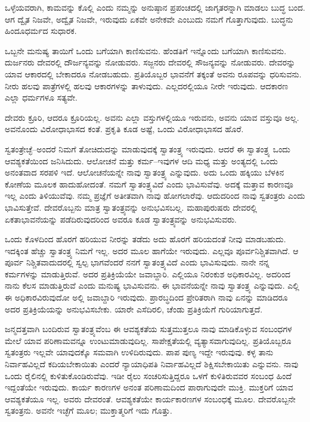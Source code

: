 ಒಳ್ಳೆಯವರಾಗಿ, ಕಾಮವನ್ನು ಕೊಲ್ಲಿ ಎಂದು ನಮ್ಮನ್ನು ಅನುಷ್ಠಾನ ಪ್ರಪಂಚದಲ್ಲಿ ಜಾಗೃತರನ್ನಾಗಿ ಮಾಡಲು ಬುದ್ಧ ಬಂದ. ಆಗ ದ್ವೈತ ನಿಜವೇ, ಅದ್ವೈತ ನಿಜವೇ, ಇರುವುದು ಏಕವೇ ಅನೇಕವೇ ಎಂಬುದು ನಮಗೆ ಗೊತ್ತಾಗುವುದು. ಬುದ್ಧನು ಹಿಂದೂಧರ್ಮದ ಸುಧಾರಕ.

ಒಬ್ಬನೇ ಮನುಷ್ಯ ತಾಯಿಗೆ ಒಂದು ಬಗೆಯಾಗಿ ಕಾಣಿಸುವನು. ಹೆಂಡತಿಗೆ ಇನ್ನೊಂದು ಬಗೆಯಾಗಿ ಕಾಣಿಸುವನು. ದುರ್ಜನರು ದೇವರಲ್ಲಿ ದೌರ್ಜನ್ಯವನ್ನು ನೋಡುವರು. ಸಜ್ಜನರು ದೇವರಲ್ಲಿ ಸೌಜನ್ಯವನ್ನು ನೋಡುವರು. ದೇವರನ್ನು ಯಾವ ಆಕಾರದಲ್ಲಿ ಬೇಕಾದರೂ ನೋಡಬಹುದು. ಪ್ರತಿಯೊಬ್ಬರ ಭಾವನೆಗೆ ತಕ್ಕಂತೆ ಅವನು ರೂಪವನ್ನು ಧರಿಸುವನು. ನೀರು ಹಲವು ಪಾತ್ರೆಗಳಲ್ಲಿ ಹಲವು ಆಕಾರಗಳನ್ನು ತಾಳುವುದು. ಎಲ್ಲದರಲ್ಲಿಯೂ ನೀರೇ ಇರುವುದು. ಆದಕಾರಣ ಎಲ್ಲಾ ಧರ್ಮಗಳೂ ಸತ್ಯವೇ.

ದೇವರು ಕ್ರೂರಿ, ಆದರೂ ಕ್ರೂರಿಯಲ್ಲ. ಅವನು ಎಲ್ಲಾ ವಸ್ತುಗಳಲ್ಲಿಯೂ ಇರುವನು, ಅವನು ಯಾವ ವಸ್ತುವೂ ಅಲ್ಲ. ಅವನೊಂದು ವಿರೋಧಾಭಾಸದ ಕಂತೆ. ಪ್ರಕೃತಿ ಕೂಡ ಅಷ್ಟೆ, ಒಂದು ವಿರೋಧಾಭಾಸದ ಹೊರೆ.

ಸ್ವತಂತ್ರೇಚ್ಛೆ–ಅಂದರೆ ನಿಮಗೆ ತೋಚಿದುದನ್ನು ಮಾಡುವುದಕ್ಕೆ ಸ್ವಾತಂತ್ರ್ಯ ಇರುವುದು. ಆದರೆ ಈ ಸ್ವಾತಂತ್ರ್ಯ ಒಂದು ಆವಶ್ಯಕತೆಯಿಂದ ಜನಿಸಿದುದು. ಆಲೋಚನೆ ಮತ್ತು ಕರ್ಮ–ಇವುಗಳ ಆದಿ ಮಧ್ಯ ಮತ್ತು ಅಂತ್ಯದಲ್ಲಿ ಒಂದು ಅನಂತವಾದ ಸರಪಳಿ ಇದೆ. ಆಲೋಚನೆಯನ್ನೇ ನಾವು ಸ್ವಾತಂತ್ರ್ಯ ಎನ್ನುವುದು. ಅದು ಒಂದು ಹಕ್ಕಿಯು ಬೆಳಕಿನ ಕೋಣೆಯ ಮೂಲಕ ಹಾದುಹೋದಂತೆ. ನಮಗೆ ಸ್ವಾತಂತ್ರ್ಯವಿದೆ ಎಂದು ಭಾವಿಸುವೆವು. ಅದಕ್ಕೆ ಮತ್ತಾವ ಕಾರಣವೂ ಇಲ್ಲ ಎಂದು ತಿಳಿಯುವೆವು. ನಮ್ಮ ಪ್ರಜ್ಞೆಗೆ ಅತೀತವಾಗಿ ನಾವು ಹೋಗಲಾರೆವು. ಆದುದರಿಂದ ನಾವು ಸ್ವತಂತ್ರರು ಎಂದು ಭಾವಿಸುತ್ತೇವೆ. ದೇವರೊಬ್ಬನು ಮಾತ್ರ ಸ್ವಾತಂತ್ರ್ಯವನ್ನು ಅನುಭವಿಸಬಲ್ಲ. ಮಹಾಪುರುಷರು ದೇವರಲ್ಲಿ ಏಕತಾಭಾವನೆಯನ್ನು ಪಡೆದಿರುವುದರಿಂದ ಅವರೂ ಕೂಡ ಸ್ವಾತಂತ್ರ್ಯವನ್ನು ಅನುಭವಿಸುವರು.

ಒಂದು ಕೊಳದಿಂದ ಹೊರಗೆ ಹರಿಯುವ ನೀರನ್ನು ತಡೆದು ಅದು ಹೊರಗೆ ಹರಿಯದಂತೆ ನೀವು ಮಾಡಬಹುದು. ಇದಕ್ಕಿಂತ ಹೆಚ್ಚು ಸ್ವಾತಂತ್ರ್ಯ ನಿಮಗೆ ಇಲ್ಲ. ಅದರ ಮೂಲ ಹಾಗೆಯೇ ಇರುವುದು. ಎಲ್ಲವೂ ಪೂರ್ವನಿಶ್ಚಿತವಾಗಿದೆ. ಆ ಪೂರ್ವ ನಿಶ್ಚಿತವಾದುದರಲ್ಲಿ ಸ್ವಲ್ಪ ಭಾಗವೆಂದರೆ ನನಗೆ ಸ್ವಾತಂತ್ರ್ಯವಿದೆ ಎಂದು ಭಾವಿಸುವುದು. ನಾನೇ ನನ್ನ ಕರ್ಮಗಳನ್ನು ಮಾಡುತ್ತಿರುವೆ. ಅದರ ಪ್ರತಿಕ್ರಿಯೆಯೇ ಜವಾಬ್ದಾರಿ. ಎಲ್ಲಿಯೂ ನಿರಂಕುಶ ಅಧಿಕಾರವಿಲ್ಲ. ಅದರಿಂದ ನಾನು ಕೆಲಸ ಮಾಡುತ್ತಿರುವೆ ಎಂದು ಮನುಷ್ಯ ಭಾವಿಸುವನು. ಈ ಭಾವನೆಯನ್ನೇ ನಾವು ಸ್ವಾತಂತ್ರ್ಯ ಎನ್ನುವುದು. ಎಲ್ಲಿ ಈ ಅಧಿಕಾರವಿರುವುದೋ ಅಲ್ಲಿ ಜವಾಬ್ದಾರಿ ಇರುವುದು. ಪ್ರಾರಬ್ಧದಿಂದ ಪ್ರೇರಿತರಾಗಿ ನಾವು ಏನನ್ನು ಮಾಡಿದರೂ ಅದರ ಪ್ರತಿಕ್ರಿಯೆಯನ್ನು ಅನುಭವಿಸಬೇಕು. ಯಾರೇ ಎಸೆದಿರಲಿ, ಚೆಂಡು ಪ್ರತಿಕ್ರಿಯೆಗೆ ಗುರಿಯಾಗುತ್ತದೆ.

ಜನ್ಮದತ್ತವಾಗಿ ಬಂದಿರುವ ಸ್ವಾತಂತ್ರ್ಯವೆಂಬ ಈ ಆವಶ್ಯಕತೆಯ ಸುತ್ತಮುತ್ತಲೂ ನಾವು ಮಾಡಿಕೊಳ್ಳುವ ಸಂಬಂಧಗಳ ಮೇಲೆ ಯಾವ ಪರಿಣಾಮವನ್ನೂ ಉಂಟುಮಾಡುವುದಿಲ್ಲ. ಸಾಪೇಕ್ಷತೆಯಲ್ಲಿ ವ್ಯತ್ಯಾಸವಾಗುವುದಿಲ್ಲ. ಪ್ರತಿಯೊಬ್ಬರೂ ಸ್ವತಂತ್ರರು ಇಲ್ಲವೇ ಯಾವುದಕ್ಕೊ ಸಮವಾಗಿ ಉಳಿದಿರುವುದು. ಪಾಪ ಪುಣ್ಯ ಇದ್ದೇ ಇರುವುವು. ಕಳ್ಳ ತಾನು ನಿರ್ವಾಹವಿಲ್ಲದೆ ಕದಿಯಬೇಕಾಯಿತು ಎಂದರೆ ನ್ಯಾಯಾಧಿಪತಿ ನಿರ್ವಾಹವಿಲ್ಲದೆ ಶಿಕ್ಷಿಸಬೇಕಾಯಿತು ಎನ್ನುವನು. ನಾವು ಒಂದು ರೈಲಿನಲ್ಲಿ ಕುಳಿತುಕೊಂಡಿರುವೆವು. ಇಡೀ ರೈಲು ಸಂಚರಿಸುತ್ತಿದ್ದರೂ ಒಳಗೆ ಕುಳಿತಿರುವವರ ಸಂಬಂಧ ಹಿಂದೆ ಇದ್ದಂತೆಯೇ ಇರುವುದು. ಕಾರ್ಯ ಕಾರಣಗಳ ಅನಂತ ಪರಿಣಾಮದಿಂದ ಪಾರಾಗುವುದೇ ಮುಕ್ತಿ. ಮುಕ್ತರಿಗೆ ಯಾವ ಆವಶ್ಯಕತೆಯೂ ಇಲ್ಲ. ಅವರು ದೇವರಂತೆ. ಆವಶ್ಯಕತೆಯೇ ಕಾರ್ಯಕಾರಣಗಳ ಸಂಬಂಧಕ್ಕೆ ಮೂಲ. ದೇವರೊಬ್ಬನೇ ಸ್ವತಂತ್ರನು. ಅವನೇ ಇಚ್ಛೆಗೆ ಮೂಲ; ಮುಕ್ತಾತ್ಮರಿಗೆ ಇದು ಗೊತ್ತು.

